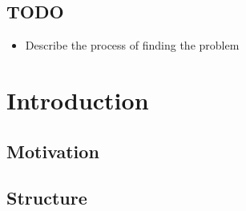 
\thispagestyle{empty}


\subsection{TODO}

\begin{itemize}
  \item Describe the process of finding the problem
\end{itemize}



\section{Introduction}

\subsection{Motivation}

\subsection{Structure}
